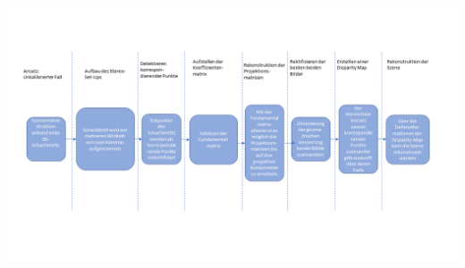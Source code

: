 \begin{minipage}{\linewidth}
	\centering
	\includegraphics[width=1.\linewidth]{images/ArbeitsProzessRealunkalibriert.png}
	\label{fig:ArbeitsProzessRealUnkalibriert}
\end{minipage}\\ \\


